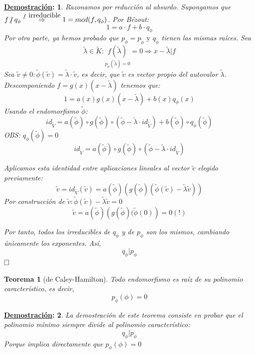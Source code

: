 \documentclass[10pt,a4paper,openright]{book}
\theoremstyle{break}
\newtheorem*{theo}{Teorema}
\newtheorem*{demo}{\underline{Demostración}:}
\begin{document}
\begin{demo}
Razonamos por reducción al absurdo. Supongamos que $f \centernot \mid q_\phi \overset{f \mbox{ irreducible}}{\Rightarrow} 1 = mcd(f, q_\phi)$. Por Bézout:
$$1 = a\cdot f + b \cdot q_\phi$$
Por otra parte, ya hemos probado que $p_\phi = p_{\tilde{\phi}} \mbox{ y } q_{\tilde{\phi}}$ tienen las mismas raíces. Sea $$\tilde{\lambda} \in \tilde{K} : \underset{ p_{\tilde{\phi}} (\tilde{\lambda}) = 0}{f(\tilde{\lambda})} = 0 \Rightarrow x - \tilde{\lambda} | f$$
Sea $\tilde{v} \neq 0 : \tilde{\phi} (\tilde{v}) = \tilde{\lambda} \cdot \tilde{v}$, es decir, que $\tilde{v}$ es vector propio del autovalor $\tilde{\lambda}$. Descomponiendo $f = g(x)(x-\tilde{\lambda})$ tenemos que:
$$1 = a(x)g(x)(x-\tilde{\lambda}) + b(x)q_\phi (x) $$
Usando el endomorfismo $\tilde{\phi}$:
$$id_{\tilde{V}} = a(\tilde{\phi})\circ g(\tilde{\phi}) \circ(\tilde{\phi} - \tilde{\lambda} \cdot id_{\tilde{V}}) + b(\tilde{\phi}) \circ q_\phi (\tilde{\phi})$$
OBS: $q_\phi (\tilde{\phi}) = 0$
$$id_{\tilde{V}} = a(\tilde{\phi})\circ g(\tilde{\phi}) \circ(\tilde{\phi} - \tilde{\lambda} \cdot id_{\tilde{V}})$$

Aplicamos esta identidad entre aplicaciones lineales al vector $\tilde{v}$ elegido previamente:
$$\tilde{v} = id_{\tilde{V}} (\tilde{v})= a(\tilde{\phi})\left( g(\tilde{\phi})( \tilde{\phi}(\tilde{v}) - \tilde{\lambda}\tilde{v})\right)$$
Por construcción de $\tilde{v} : \tilde{\phi}(\tilde{v}) - \tilde{\lambda}\tilde{v} = 0$
$$\tilde{v} = a(\tilde{\phi})\left( g(\tilde{\phi})( \tilde{\phi}(0)\right) = 0 (!)$$

Por tanto, todos los irreducibles de $q_\phi$ y de $p_\phi$ son los mismos, cambiando únicamente los exponentes. Así, $$q_\phi | p_\phi$$
$\hfill\square$
\end{demo}

\begin{theo}[de Caley-Hamilton]
Todo endomorfismo es raíz de su polinomio característico, es decir,
$$p_\phi (\phi) = 0$$
\end{theo}
\begin{demo}
La demostración de este teorema consiste en probar que el polinomio mínimo siempre divide al polinomio característico:
$$q_\phi | p_\phi$$
Porque implica directamente que $p_\phi (\phi) = 0$
\end{demo}
\end{document}

